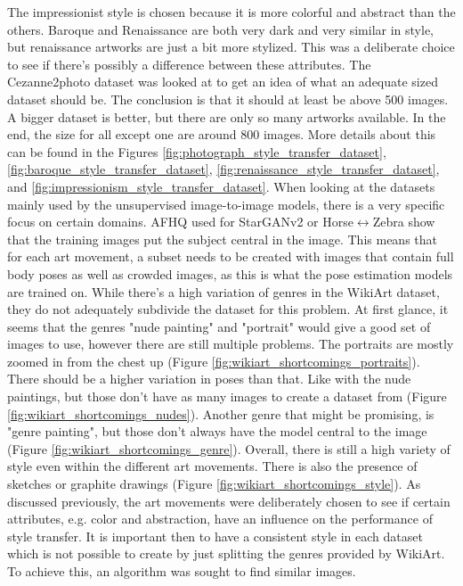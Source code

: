 The impressionist style is chosen because it is more colorful and abstract than the others.
Baroque and Renaissance are both very dark and very similar in style, but renaissance artworks are just a bit more stylized.
This was a deliberate choice to see if there's possibly a difference between these attributes.
The Cezanne2photo dataset \cite{Zhu2017b} was looked at to get an idea of what an adequate sized dataset should be.
The conclusion is that it should at least be above 500 images.
A bigger dataset is better, but there are only so many artworks available.
In the end, the size for all except one are around 800 images.
More details about this can be found in the Figures \ref{fig:photograph_style_transfer_dataset}, \ref{fig:baroque_style_transfer_dataset}, \ref{fig:renaissance_style_transfer_dataset}, and \ref{fig:impressionism_style_transfer_dataset}.
When looking at the datasets mainly used by the unsupervised image-to-image models, there is a very specific focus on certain domains.
\gls{AFHQ} used for StarGANv2 or Horse$\leftrightarrow$Zebra show that the training images put the subject central in the image.
This means that for each art movement, a subset needs to be created with images that contain full body poses as well as crowded images, as this is what the pose estimation models are trained on.
While there's a high variation of genres in the WikiArt dataset, they do not adequately subdivide the dataset for this problem.
At first glance, it seems that the genres "nude painting" and "portrait" would give a good set of images to use, however there are still multiple problems.
The portraits are mostly zoomed in from the chest up (Figure \ref{fig:wikiart_shortcomings_portraits}).
There should be a higher variation in poses than that.
Like with the nude paintings, but those don't have as many images to create a dataset from (Figure \ref{fig:wikiart_shortcomings_nudes}).
Another genre that might be promising, is "genre painting", but those don't always have the model central to the image (Figure \ref{fig:wikiart_shortcomings_genre}).
Overall, there is still a high variety of style even within the different art movements.
There is also the presence of sketches or graphite drawings (Figure \ref{fig:wikiart_shortcomings_style}).
As discussed previously, the art movements were deliberately chosen to see if certain attributes, e.g. color and abstraction, have an influence on the performance of style transfer.
It is important then to have a consistent style in each dataset which is not possible to create by just splitting the genres provided by WikiArt.
To achieve this, an algorithm was sought to find similar images.

